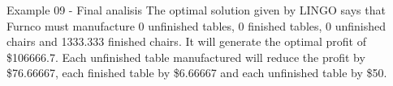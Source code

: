 \begin{frame}{Example 09 - Final analisis}
The optimal solution given by LINGO says that Furnco must manufacture
0 unfinished tables, 0 finished tables, 0 unfinished chairs and  1333.333 finished chairs.
It will generate the optimal profit of \$106666.7. Each unfinished table manufactured
will reduce the profit by \$76.66667, each finished table by \$6.66667 and each
unfinished table by \$50.
\end{frame}
